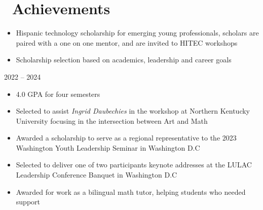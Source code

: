 \documentclass{resume}
\begin{document}
\section{\faCertificate\ Achievements}
\begin{itemize}
    \item Hispanic technology scholarship for emerging young professionals, scholars are paired with a one on one mentor, and are invited to HITEC workshops
\end{itemize}
\vspace{0.2em}
\begin{itemize}
    \item Scholarship selection based on academics, leadership and career goals
\end{itemize}
\vspace{0.2em}
 {2022 -- 2024}
\begin{itemize}
    \item 4.0 GPA for four semesters
\end{itemize}
\vspace{0.2em}
\begin{itemize}
    \item Selected to assist \textit{Ingrid Daubechies} in the workshop at Northern Kentucky University focusing in the intersection between Art and Math
\end{itemize}
\vspace{0.2em}
\begin{itemize}[parsep=0.5ex]
    \item Awarded a scholarship to serve as a regional representative to the 2023 Washington Youth Leadership Seminar in Washington D.C
    \item Selected to deliver one of two participants keynote addresses at the LULAC Leadership Conference Banquet in Washington D.C
\end{itemize}
\vspace{0.2em}
\begin{itemize}
    \item Awarded for work as a bilingual math tutor, helping students who needed support
\end{itemize}
\end{document}
